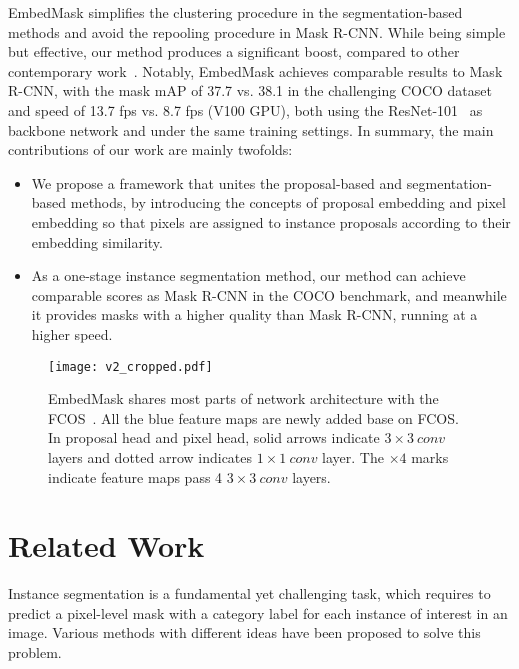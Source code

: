 \documentclass[10pt,twocolumn,letterpaper]{article}
\begin{document}
EmbedMask simplifies the clustering procedure in the segmentation-based methods and avoid the repooling procedure in Mask R-CNN. 
While being simple but effective, our method produces a significant boost, compared to other contemporary work~\cite{bolya-iccv2019, xie2019polarmask}. 
Notably, EmbedMask achieves comparable results to Mask R-CNN, with the mask mAP of 37.7 vs. 38.1 in the challenging COCO dataset~\cite{lin2014microsoft} and speed of 13.7 fps vs. 8.7 fps (V100 GPU), both using the ResNet-101~\cite{he2016deep} as backbone network and under the same training settings. In summary, the main contributions of our work are mainly twofolds:
\begin{itemize}

\item We propose a framework that unites the proposal-based and segmentation-based methods, by introducing the concepts of proposal embedding and pixel embedding so that pixels are assigned to instance proposals according to their embedding similarity.
\item As a one-stage instance segmentation method, our method can achieve comparable scores as Mask R-CNN in the COCO benchmark, and meanwhile it provides masks with a higher quality than Mask R-CNN, running at a higher speed. 

\end{itemize}

\begin{figure*}
   \begin{center}
      \texttt{[image: v2\_cropped.pdf]}
   \end{center}
      \caption{EmbedMask shares most parts of network architecture with the 
      FCOS~\cite{tian2019fcos}. All the blue feature maps are newly added base on FCOS.
      In proposal head and pixel head, solid arrows indicate $3\times3\ conv$ layers and dotted arrow indicates $1\times1\ conv$ layer. 
      The $\times 4$ marks indicate feature maps pass 4 $3\times3\ conv$ layers.
}
   \label{fig:architecture}
\end{figure*}

\section{Related Work}

Instance segmentation is a fundamental yet challenging task, which requires to predict a pixel-level mask with a category label for each instance of interest in an image. 
Various methods with different ideas have been proposed to solve this problem. 
\end{document}
